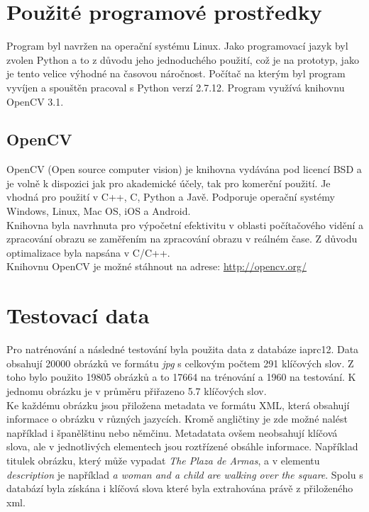 \documentclass{report}
\begin{document}
\chapter{Použité programové prostředky}
Program byl navržen na operační systému Linux. Jako programovací jazyk byl zvolen Python a to z důvodu jeho jednoduchého použití, což je na prototyp, jako je tento velice výhodné na časovou náročnost. Počítač na kterým byl program vyvíjen a spouštěn pracoval s Python verzí 2.7.12. Program využívá knihovnu OpenCV 3.1. 
  
\section{OpenCV}
OpenCV (Open source computer vision) je knihovna vydávána pod licencí BSD a je volně k dispozici jak pro akademické účely, tak pro komerční použití. Je vhodná pro použití v C++, C, Python a Javě. Podporuje operační systémy Windows, Linux, Mac OS, iOS a Android.
\\
Knihovna byla navrhnuta pro výpočetní efektivitu v oblasti počítačového vidění a zpracování obrazu se zaměřením na zpracování obrazu v reálném čase. Z důvodu optimalizace byla napsána v C/C++. 
\\
Knihovnu OpenCV je možné stáhnout na adrese: \url{http://opencv.org/}  

\chapter{Testovací data}
Pro natrénování a následné testování byla použita data z databáze iaprc12. Data obsahují \num{20 000} obrázků ve formátu \textit{jpg} s celkovým počtem 291 klíčových slov. Z toho bylo použito \num{19 805} obrázků a to \num{17 664} na trénování a \num{1 960} na testování. K jednomu obrázku je v průměru přiřazeno 5.7 klíčových slov.\\

Ke každému obrázku jsou přiložena metadata ve formátu XML, která obsahují informace o obrázku v různých jazycích. Kromě angličtiny je zde možné nalést například i španělštinu nebo němčinu. Metadatata ovšem neobsahují klíčová slova, ale v jednotlivých elementech jsou roztřízené obsáhle informace. Například titulek obrázku, který může vypadat \textit{The Plaza de Armas}, a v elementu \textit{description} je například \textit{a woman and a child are walking over the square}. Spolu s databází byla získána i klíčová slova které byla extrahována právě z přiloženého xml.
\end{document}
